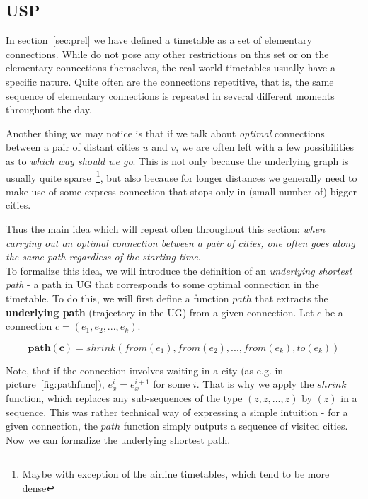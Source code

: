 \subsection{USP}

	In section~\ref{sec:prel} we have defined a timetable as a set of elementary connections. While do not pose any other restrictions on this set or on the elementary connections themselves, the real world timetables usually have a specific nature. Quite often are the connections repetitive, that is, the same sequence of elementary connections is repeated in several different moments throughout the day.
	
	Another thing we may notice is that if we talk about \textit{optimal} connections between a pair of distant cities $u$ and $v$, we are often left with a few possibilities as to \textit{which way should we go}. This is not only because the underlying graph is usually quite sparse~\footnote{Maybe with exception of the airline timetables, which tend to be more dense}, but also because for longer distances we generally need to make use of some express connection that stops only in (small number of) bigger cities.
	
	Thus the main idea which will repeat often throughout this section: \textit{when carrying out an optimal connection between a pair of cities, one often goes along the same path regardless of the starting time}. \\
	
	\noindent To formalize this idea, we will introduce the definition of an \textit{underlying shortest path} - a path in UG that corresponds to some optimal connection in the timetable. To do this, we will first define a function $path$ that extracts the \textbf{underlying path} (trajectory in the UG) from a given connection. Let $c$ be a connection $c = (e_{1}, e_{2}, ..., e_{k})$.
	
	\begin{equation*}
		\bm{path(c)} = shrink(from(e_{1}), from(e_{2}), ..., from(e_{k}), to(e_{k}))
	\end{equation*}
	
	\noindent Note, that if the connection involves waiting in a city (as e.g. in picture~\ref{fig:pathfunc}), $e_{x}^{i} = e_{x}^{i + 1}$ for some $i$. That is why we apply the $shrink$ function, which replaces any sub-sequences of the type $(z, z, ..., z)$ by $(z)$ in a sequence. This was rather technical way of expressing a simple intuition - for a given connection, the $path$ function simply outputs a sequence of visited cities. Now we can formalize the underlying shortest path.
	
